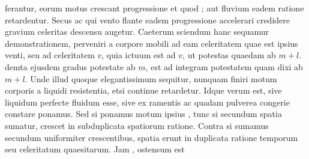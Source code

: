 ferantur, eorum motus crescant progressione 
et quod ;
aut fluvium eadem ratione retardentur. Secus ac  qui vento flante eadem progressione accelerari credidere 
gravium\protect{} celeritas descensu augetur. Caeterum sciendum 
hanc sequamur demonstrationem, 
perveniri a corpore mobili ad eam celeritatem quae est ipsius venti, seu ad celeritatem $\displaystyle v$, quia 
%
%
ictuum est ad $\displaystyle v$, ut potestas quaedam ab $\displaystyle m + l$. demta ejusdem gradus potestate ab $\displaystyle m$, est ad integram potestatem quam dixi ab $\displaystyle m + l$.
Unde illud quoque elegantissimum sequitur, nunquam finiri motum corporis a liquidi resistentia\protect{}, etsi continue retardetur. Idque verum est, sive liquidum perfecte fluidum esse, sive ex ramentis ac quadam pulverea congerie constare ponamus.
\pend
\pstart
%
%
Sed si ponamus motum ipsius ,
tunc si secundum spatia sumatur, crescet in subduplicata spatiorum ratione. Contra si sumamus secundum 
uniformiter crescentibus, spatia erunt in duplicata ratione temporum seu celeritatum quaesitarum. Jam ,
ostensum est 
%
